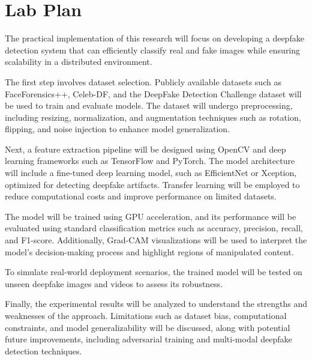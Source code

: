 \documentclass[a4paper,12pt]{article}
\begin{document}
\newpage

\section{Lab Plan}
The practical implementation of this research will focus on developing a deepfake detection system that can efficiently classify real and fake images while ensuring scalability in a distributed environment.

The first step involves dataset selection. Publicly available datasets such as FaceForensics++, Celeb-DF, and the DeepFake Detection Challenge dataset will be used to train and evaluate models. The dataset will undergo preprocessing, including resizing, normalization, and augmentation techniques such as rotation, flipping, and noise injection to enhance model generalization.

Next, a feature extraction pipeline will be designed using OpenCV and deep learning frameworks such as TensorFlow and PyTorch. The model architecture will include a fine-tuned deep learning model, such as EfficientNet or Xception, optimized for detecting deepfake artifacts. Transfer learning will be employed to reduce computational costs and improve performance on limited datasets.

The model will be trained using GPU acceleration, and its performance will be evaluated using standard classification metrics such as accuracy, precision, recall, and F1-score. Additionally, Grad-CAM visualizations will be used to interpret the model’s decision-making process and highlight regions of manipulated content.

To simulate real-world deployment scenarios, the trained model will be tested on unseen deepfake images and videos to assess its robustness. 

Finally, the experimental results will be analyzed to understand the strengths and weaknesses of the approach. Limitations such as dataset bias, computational constraints, and model generalizability will be discussed, along with potential future improvements, including adversarial training and multi-modal deepfake detection techniques.
\end{document}
